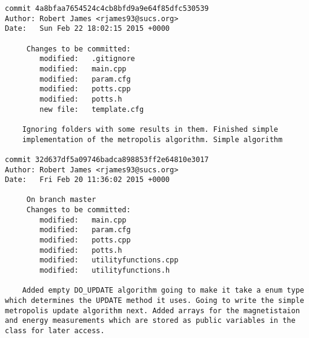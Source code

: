 \documentclass[12pt,a4paper,notitlepage,twoside]{memoir}
\begin{document}
\begin{lstlisting}[breaklines]
commit 4a8bfaa7654524c4cb8bfd9a9e64f85dfc530539
Author: Robert James <rjames93@sucs.org>
Date:   Sun Feb 22 18:02:15 2015 +0000

     Changes to be committed:
    	modified:   .gitignore
    	modified:   main.cpp
    	modified:   param.cfg
    	modified:   potts.cpp
    	modified:   potts.h
    	new file:   template.cfg
    
    Ignoring folders with some results in them. Finished simple
    implementation of the metropolis algorithm. Simple algorithm

commit 32d637df5a09746badca898853ff2e64810e3017
Author: Robert James <rjames93@sucs.org>
Date:   Fri Feb 20 11:36:02 2015 +0000

     On branch master
     Changes to be committed:
    	modified:   main.cpp
    	modified:   param.cfg
    	modified:   potts.cpp
    	modified:   potts.h
    	modified:   utilityfunctions.cpp
    	modified:   utilityfunctions.h
    
    Added empty DO_UPDATE algorithm going to make it take a enum type which determines the UPDATE method it uses. Going to write the simple metropolis update algorithm next. Added arrays for the magnetistaion and energy measurements which are stored as public variables in the class for later access.

\end{lstlisting}
\end{document}
